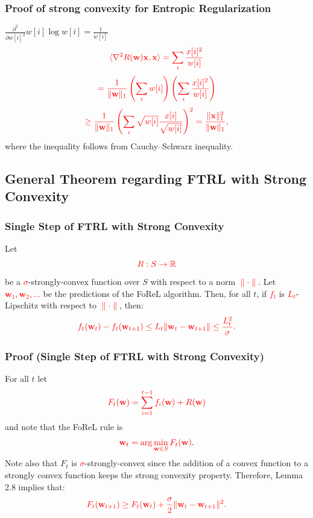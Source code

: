 \documentclass[handout]{beamer}
\begin{document}
\begin{small}
\begin{frame}
    \frametitle{Proof of strong convexity for Entropic Regularization}
    $\frac{\partial^2}{\partial w[i]^2} w[i] \log w[i] = \frac{1}{w[i]}$ 
    \[
    \textcolor{red}{\langle \nabla^2 R(\mathbf{w})\mathbf{x},\mathbf{x} \rangle = \sum_i \frac{x[i]^2}{w[i]}}
    \]
    \[
    \textcolor{red}{= \frac{1}{\|\mathbf{w}\|_1} \left(\sum_i w[i] \right) \left(\sum_i \frac{x[i]^2}{w[i]} \right)}
    \]
    \[
    \textcolor{red}{\geq \frac{1}{\|\mathbf{w}\|_1} \left(\sum_i \sqrt{w[i]} \frac{x[i]}{\sqrt{w[i]}} \right)^2 = \frac{\|\mathbf{x}\|_1^2}{\|\mathbf{w}\|_1},}
    \]
    where the inequality follows from Cauchy–Schwarz inequality.
\end{frame}

\subsection{General Theorem regarding FTRL with Strong Convexity}
\begin{frame}
    \frametitle{Single Step of FTRL with Strong Convexity}
    Let 
    \[
    \textcolor{red}{R : S \to \mathbb{R}}
    \]
    be a \textcolor{red}{$\sigma$}-strongly-convex function over $S$ with respect to a norm \textcolor{red}{$\|\cdot\|$}. Let \textcolor{red}{$\mathbf{w}_1, \mathbf{w}_2, \dots$} be the predictions of the FoReL algorithm. Then, for all $t$, if \textcolor{red}{$f_t$} is \textcolor{red}{$L_t$}-Lipschitz with respect to \textcolor{red}{$\|\cdot\|$}, then:
    \[
    \textcolor{red}{f_t(\mathbf{w}_t) - f_t(\mathbf{w}_{t+1}) \leq L_t \|\mathbf{w}_t - \mathbf{w}_{t+1}\| \leq \frac{L_t^2}{\sigma}.}
    \]
\end{frame}

\begin{frame}
    \frametitle{Proof (Single Step of FTRL with Strong Convexity)}
    For all $t$ let 
    \[
    \textcolor{red}{F_t(\mathbf{w}) = \sum_{i=1}^{t-1} f_i(\mathbf{w}) + R(\mathbf{w})}
    \]
    and note that the FoReL rule is 
    \[
    \textcolor{red}{\mathbf{w}_t = \arg\min_{\mathbf{w} \in S} F_t(\mathbf{w})}.
    \]
    Note also that $F_t$ is \textcolor{red}{$\sigma$}-strongly-convex since the addition of a convex function to a strongly convex function keeps the strong convexity property. Therefore, Lemma 2.8 implies that:
    \[
    \textcolor{red}{F_t(\mathbf{w}_{t+1}) \geq F_t(\mathbf{w}_t) + \frac{\sigma}{2} \|\mathbf{w}_t - \mathbf{w}_{t+1}\|^2.}
    \]
\end{frame}


\end{small}
\end{document}
